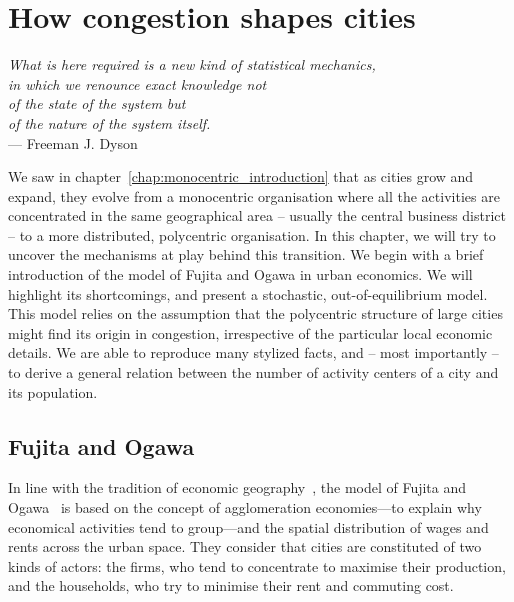 \chapter{How congestion shapes cities}
\label{chap:monocentric_model}

\begin{flushright}{\slshape    
What is here required is a new kind of statistical mechanics,\\
in which we renounce exact knowledge not\\
of the state of the system but\\
of the nature of the system itself.}  \\ \medskip
--- Freeman J. Dyson~\cite{Dyson:1962}
\end{flushright}


\bigskip


We saw in chapter~\ref{chap:monocentric_introduction} that as cities grow and
expand, they evolve from a monocentric organisation where all the activities are
concentrated in the same geographical area -- usually the central business
district -- to a more distributed, polycentric organisation. In this chapter, we
will try to uncover the mechanisms at play behind this transition. We begin with
a brief introduction of the model of Fujita and Ogawa in urban economics. We
will highlight its shortcomings, and present a stochastic, out-of-equilibrium
model. This model relies on the assumption that the polycentric structure of
large cities might find its origin in congestion, irrespective of the particular
local economic details. We are able to reproduce many stylized facts, and --
most importantly -- to derive a general relation between the number of activity
centers of a city and its population. 


\section{Fujita and Ogawa}
\label{sec:fujita_and_ogawa}

In line with the tradition of economic geography~\cite{Fujita:2001}, the model
of Fujita and Ogawa~\cite{Fujita:1982} is based on the concept of agglomeration
economies---to explain why economical activities tend to group---and the spatial
distribution of wages and rents across the urban space. They consider that
cities are constituted of two kinds of actors: the firms, who tend to
concentrate to maximise their production, and the households, who try to
minimise their rent and commuting cost.\\ 

